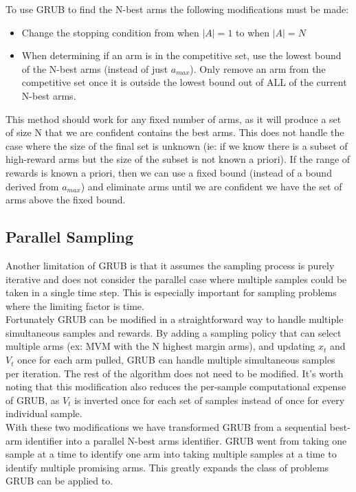 \documentclass{article}[12pt]
\begin{document}
To use GRUB to find the N-best arms the following modifications must be made: \\
\begin{itemize}
    \item Change the stopping condition from when $|A|=1$ to when $|A|=N$
    \item When determining if an arm is in the competitive set, use the lowest bound of the N-best arms (instead of just $a_{max}$).
    Only remove an arm from the competitive set once it is outside the lowest bound out of ALL of the current N-best arms.
\end{itemize}

This method should work for any fixed number of arms, as it will produce a set of size N that we are confident contains the best arms.
This does not handle the case where the size of the final set is unknown
(ie: if we know there is a subset of high-reward arms but the size of the subset is not known a priori).
If the range of rewards is known a priori, then we can use a fixed bound (instead of a bound derived from $a_{max}$) and eliminate arms until we are confident we have the set of arms above the fixed bound.

\subsection{Parallel Sampling}

Another limitation of GRUB is that it assumes the sampling process is purely iterative and does not consider the parallel case where multiple samples could be taken in a single time step.
This is especially important for sampling problems where the limiting factor is time. \\

Fortunately GRUB can be modified in a straightforward way to handle multiple simultaneous samples and rewards.
By adding a sampling policy that can select multiple arms (ex: MVM with the N highest margin arms), and updating $x_t$ and $V_t$ once for each arm pulled,
GRUB can handle multiple simultaneous samples per iteration.
The rest of the algorithm does not need to be modified.
It’s worth noting that this modification also reduces the per-sample computational expense of GRUB,
as $V_t$ is inverted once for each set of samples instead of once for every individual sample. \\

With these two modifications we have transformed GRUB from a sequential best-arm identifier into a parallel N-best arms identifier.
GRUB went from taking one sample at a time to identify one arm into taking multiple samples at a time to identify multiple promising arms.
This greatly expands the class of problems GRUB can be applied to.
\end{document}
